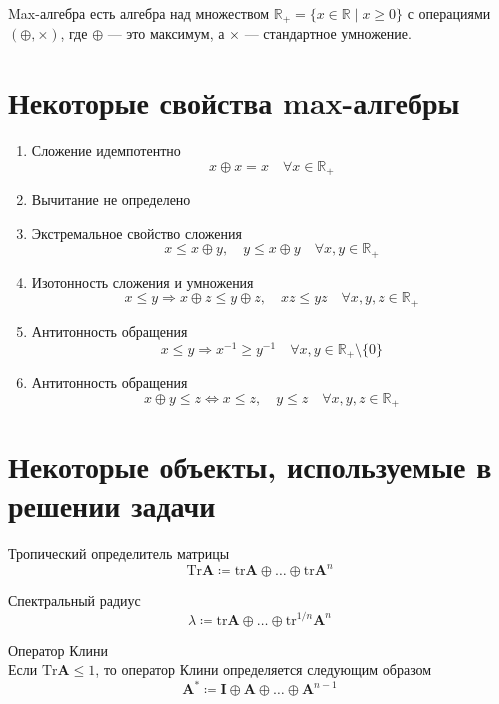 \documentclass[specialist,
  substylefile = spbu.rtx,
  href,
  colorlinks=true,
  12pt]{disser}
\begin{document}
  \begin{definition}{Max-алгебра}
  	есть алгебра над множеством $\mathbb{R}_{+}=\{x \in \mathbb{R} \mid x \geq 0\}$ с операциями ${(\oplus, \times)}$, где $\oplus$ --- это максимум, а $\times$ --- стандартное умножение.
  \end{definition}
  
  \section{Некоторые свойства max-алгебры}
  
  \begin{enumerate}
  	\item Сложение идемпотентно
  	\[
  	x \oplus x = x \quad \forall x \in \mathbb{R}_+
  	\]
  	\item Вычитание не определено
  	\item Экстремальное свойство сложения
  	\[
  	x \leq x \oplus y,\quad y \leq x \oplus y \quad \forall x, y \in \mathbb{R}_+
  	\]
  	\item Изотонность сложения и умножения
  	\[
  	x \leq y \Rightarrow x \oplus z \leq y \oplus z,\quad xz \leq yz \quad \forall x,y,z \in \mathbb{R}_+
  	\]
  	\item Антитонность обращения
  	\[
  	x \leq y \Rightarrow x^{-1} \geq y^{-1} \quad\forall x,y \in \mathbb{R}_+ \setminus \{0\}
  	\]
  	\item Антитонность обращения
  	\[
  	x \oplus y \leq z \Leftrightarrow x \leq z,\quad y \leq z \quad \forall x,y,z \in \mathbb{R}_+
  	\]
  \end{enumerate}
\section{Некоторые объекты, используемые в решении задачи}

\begin{definition}{Тропический определитель матрицы}
	\[
	\mathrm{Tr} \boldsymbol{A} \coloneqq \mathrm{tr}\boldsymbol{A} \oplus \dots \oplus \mathrm{tr}\boldsymbol{A}^n
	\]
\end{definition}
\begin{definition}{Спектральный радиус}
	\[
	\lambda \coloneqq \mathrm{tr}\boldsymbol{A} \oplus \dots \oplus \mathrm{tr}^{1/n}\boldsymbol{A}^n
	\]
\end{definition}
\begin{definition}{Оператор Клини\\}
	Если $\mathrm{Tr} \boldsymbol{A} \leq 1$, то оператор Клини определяется следующим образом
	\[
	\boldsymbol{A}^* \coloneqq \boldsymbol{I} \oplus \boldsymbol{A} \oplus \dots \oplus \boldsymbol{A}^{n-1}
	\]
\end{definition}
\end{document}
